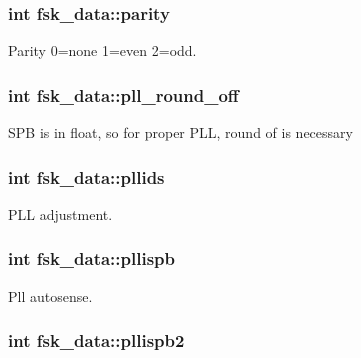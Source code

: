 \subsubsection[{parity}]{\setlength{\rightskip}{0pt plus 5cm}int fsk\+\_\+data\+::parity}\label{structfsk__data_afc8612ac1878ff9b31ea6dcf5e712faf}


Parity 0=none 1=even 2=odd. 

\hypertarget{structfsk__data_a1c1e27f259f858b132ab2e2f0c329770}{}
\subsubsection[{pll\+\_\+round\+\_\+off}]{\setlength{\rightskip}{0pt plus 5cm}int fsk\+\_\+data\+::pll\+\_\+round\+\_\+off}\label{structfsk__data_a1c1e27f259f858b132ab2e2f0c329770}
S\+P\+B is in float, so for proper P\+L\+L, round of is necessary \hypertarget{structfsk__data_ac5ff3d61665d426edf3fcc34254239b6}{}
\subsubsection[{pllids}]{\setlength{\rightskip}{0pt plus 5cm}int fsk\+\_\+data\+::pllids}\label{structfsk__data_ac5ff3d61665d426edf3fcc34254239b6}


P\+L\+L adjustment. 

\hypertarget{structfsk__data_ae12b4a66a5ad3c75bf39681fb9d6e77d}{}
\subsubsection[{pllispb}]{\setlength{\rightskip}{0pt plus 5cm}int fsk\+\_\+data\+::pllispb}\label{structfsk__data_ae12b4a66a5ad3c75bf39681fb9d6e77d}


Pll autosense. 

\hypertarget{structfsk__data_aef22fc3fb9ea600a31e9ce03124568ae}{}
\subsubsection[{pllispb2}]{\setlength{\rightskip}{0pt plus 5cm}int fsk\+\_\+data\+::pllispb2}\label{structfsk__data_aef22fc3fb9ea600a31e9ce03124568ae}


